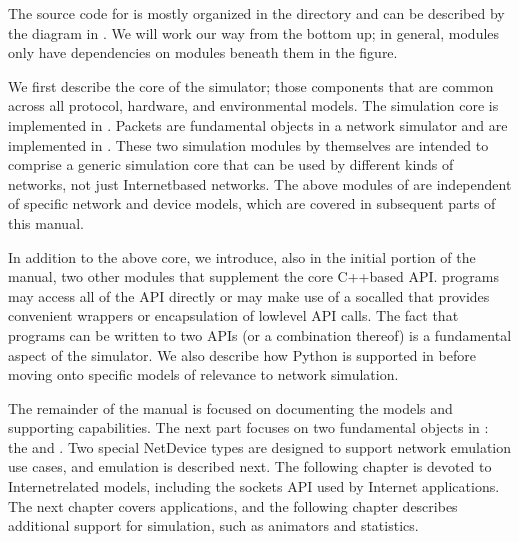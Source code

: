 \documentclass[letterpaper,10pt,english]{sphinxmanual}
\renewcommand{\sphinxcode}[1]{\texttt{\small{#1}}}
\begin{document}
The source code for  is mostly organized in the \sphinxcode{} directory and
can be described by the diagram in {\hyperref[\detokenize{organization:software-organization}]{}}. We will
work our way from the bottom up; in general, modules only have dependencies
on modules beneath them in the figure.

We first describe the core of the simulator; those components that are
common across all protocol, hardware, and environmental models.
The simulation core is implemented in \sphinxcode{}. Packets are
fundamental objects in a network simulator
and are implemented in \sphinxcode{}. These two simulation modules by
themselves are intended to comprise a generic simulation core that can be
used by different kinds of networks, not just Internet\sphinxhyphen{}based networks.  The
above modules of  are independent of specific network and device
models, which are covered in subsequent parts of this manual.

In addition to the above  core, we introduce, also in the initial
portion of the manual, two other modules that supplement the core C++\sphinxhyphen{}based
API.   programs may access
all of the API directly or may make use of a so\sphinxhyphen{}called  that
provides convenient wrappers or encapsulation of low\sphinxhyphen{}level API calls. The
fact that  programs can be written to two APIs (or a combination
thereof) is a fundamental aspect of the simulator.
We also describe how Python is supported in  before moving onto
specific models of relevance to network simulation.

The remainder of the manual is focused on documenting the models and
supporting capabilities.  The next part focuses on two fundamental objects in
:  the \sphinxcode{} and \sphinxcode{}. Two special NetDevice types are
designed to support network emulation use cases, and emulation is described
next.  The following chapter is devoted to Internet\sphinxhyphen{}related models,
including the
sockets API used by Internet applications. The next chapter covers
applications, and the following chapter describes additional support for
simulation, such as animators and statistics.
\end{document}
